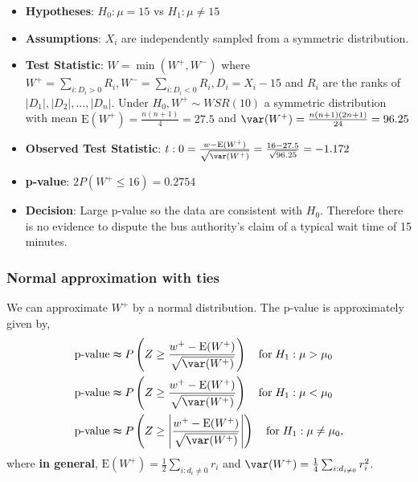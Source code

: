 \documentclass[a4paper]{article}\usepackage[]{graphicx}\usepackage[]{xcolor}
\begin{document}
\begin{itemize}
	\item \textbf{Hypotheses}: \( H_0: \mu = 15 \) vs \( H_1: \mu \neq 15 \)
	\item \textbf{Assumptions}: \( X_i \) are independently sampled from a symmetric distribution.
	\item \textbf{Test Statistic}: \( W = \min(W^+,W^-) \) where \( W^+ = \sum_{i:D_i>0} R_i, W^- = \sum_{i:D_i<0} R_i, D_i = X_i - 15  \)  and \( R_i \) are the ranks of \( \lvert D_1 \rvert, \lvert D_2 \rvert, \dotsc, \lvert D_n \rvert \). Under \( H_0, W^+ \sim WSR(10) \) a symmetric distribution with mean \( \mathrm{\mathrm{E}} (W^+) = \frac{n(n+1)}{4} = 27.5 \) and \( \var(W^+) = \frac{n(n+1)(2n+1)}{24} = 96.25\)  
	\item \textbf{Observed Test Statistic}: \( t:0 = \frac{w - \mathrm{E}(W^+)}{\sqrt{\var(W^+)}}  = \frac{16-27.5}{\sqrt{96.25}} = -1.172 \)
	\item \textbf{p-value}: \( 2P(W^+ \leq 16) = 0.2754 \)
	\item \textbf{Decision}: Large p-value so the data are consistent with \( H_0 \). Therefore there is no evidence to dispute the bus authority's claim of a typical wait time of 15 minutes.
\end{itemize}
\subsubsection{Normal approximation with ties}
We can approximate \( W^+ \) by a normal distribution. The p-value is approximately given by,
\begin{align*}
	\text{p-value} &\thickapprox P \left( Z \geq \frac{w^+ - \mathrm{E}(W^+)}{\sqrt{\var(W^+)}} \right) \quad\text{for}\; H_1: \mu > \mu_0\\
	\text{p-value} &\thickapprox P \left( Z \geq \frac{w^+ - \mathrm{E}(W^+)}{\sqrt{\var(W^+)}} \right) \quad\text{for}\; H_1: \mu < \mu_0\\
	\text{p-value} &\thickapprox P \left( Z \geq \left\vert\frac{w^+ - \mathrm{E}(W^+)}{\sqrt{\var(W^+)}}\right\vert \right) \quad\text{for}\; H_1: \mu \neq \mu_0,
\end{align*}
where \textcolor{myred}{\textbf{in general}}, \( \mathrm{E}(W^+) = \frac{1}{2}\sum_{i:d_i \neq 0}r_i \) and \( \var(W^+) = \frac{1}{4}\sum_{i:d_{i \neq 0}} r^{2}_{i} \).
\end{document}
